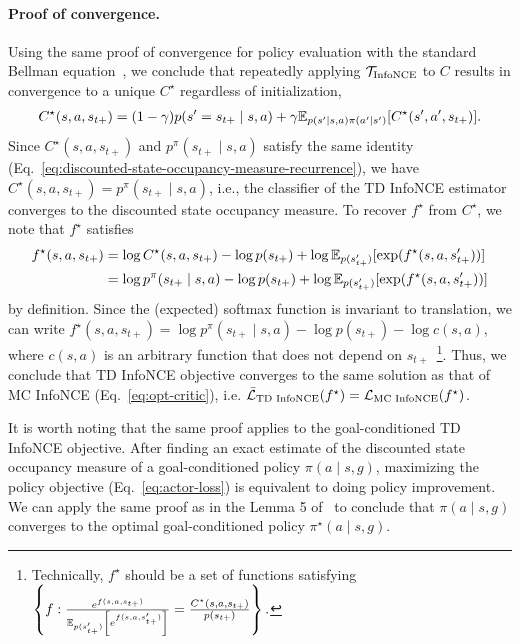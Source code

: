 \documentclass{article} %
\begin{document}
\paragraph{Proof of convergence.} Using the same proof of convergence for policy evaluation with the standard Bellman equation~\citep{sutton2018reinforcement, agarwal2019reinforcement}, we conclude that repeatedly applying ${\mathcal{T}}_{\text{InfoNCE}}$ to $C$ results in convergence to a unique $C^{\star}$ regardless of initialization,
\begin{align*}
    C^{\star}(s, a, s_{t+}) = (1 - \gamma) p(s' = s_{t+} \mid s, a) + \gamma \mathbb{E}_{p(s' \mid s, a) \pi(a' \mid s')}[C^{\star}(s', a', s_{t+})].
\end{align*}
Since $C^{\star}(s, a, s_{t+})$ and $p^{\pi}(s_{t+} \mid s, a)$ satisfy the same identity (Eq.~\ref{eq:discounted-state-occupancy-measure-recurrence}), we have $C^{\star}(s, a, s_{t+}) = p^{\pi}(s_{t+} \mid s, a)$, i.e., the classifier of the TD InfoNCE estimator converges to the discounted state occupancy measure. To recover $f^{\star}$ from $C^{\star}$, we note that $f^{\star}$ satisfies
\begin{align*}
    f^{\star}(s, a, s_{t+}) &= \log C^{\star}(s, a, s_{t+}) - \log p(s_{t+}) + \log \mathbb{E}_{p(s_{t+}')}[\exp(f^{\star}(s, a, s_{t+}'))] \\
    &= \log p^{\pi}(s_{t+} \mid s, a) - \log p(s_{t+}) + \log \mathbb{E}_{p(s_{t+}')}[\exp(f^{\star}(s, a, s_{t+}'))]
\end{align*}
by definition.
Since the (expected) softmax function is invariant to translation, we can write $f^{\star}(s, a, s_{t+}) = \log p^{\pi}(s_{t+} \mid s, a) - \log p(s_{t+}) - \log c(s, a)$, where $c(s, a)$ is an arbitrary function that does not depend on $s_{t+}$~\footnote{Technically, $f^{\star}$ should be a set of functions satisfying $\left\{ f: \frac{e^{f(s, a, s_{t+})}}{\mathbb{E}_{p(s_{t+}')}\left[e^{f(s, a, s_{t+}')} \right]} = \frac{C^{\star}(s, a, s_{t+})}{p(s_{t+})} \right\}.$}. Thus, we conclude that TD InfoNCE objective converges to the same solution as that of MC InfoNCE (Eq.~\ref{eq:opt-critic}), i.e. $\bar{{\mathcal{L}}}_{\text{TD InfoNCE}}(f^{\star}) = {\mathcal{L}}_{\text{MC InfoNCE}}(f^{\star})$.

It is worth noting that the same proof applies to the goal-conditioned TD InfoNCE objective. After finding an exact estimate of the discounted state occupancy measure of a goal-conditioned policy $\pi(a \mid s, g)$, maximizing the policy objective (Eq.~\ref{eq:actor-loss}) is equivalent to doing policy improvement. We can apply the same proof as in the Lemma 5 of~\citep{eysenbach2020c} to conclude that $\pi(a \mid s, g)$ converges to the optimal goal-conditioned policy $\pi^{\star}(a \mid s, g)$.
\end{document}
